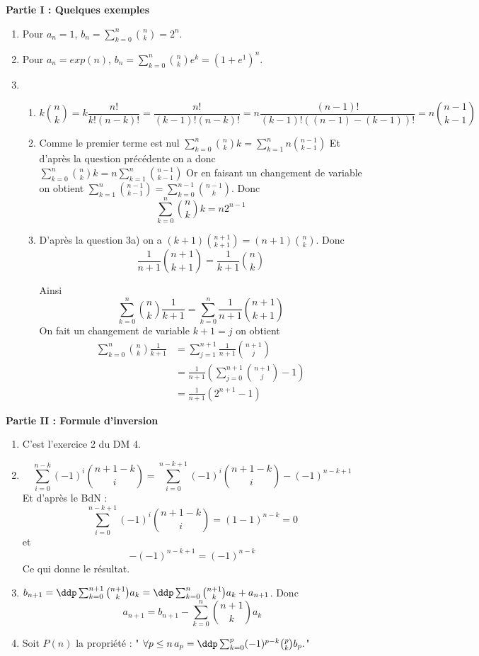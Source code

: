 \documentclass[a4paper, 11pt,reqno]{article}
\begin{document}
\begin{correction}
\begin{center}
\textbf{Partie I : Quelques exemples}
\end{center}
\begin{enumerate}
\item Pour $a_n=1$, $b_n=\sum_{k=0}^n \binom{n}{k}  =2^n$.
\item  Pour $a_n=exp(n)$, $b_n=\sum_{k=0}^n \binom{n}{k}e^k  =(1+e^1)^n$.
\item
\begin{enumerate}
\item  $$k\binom{n}{k}= k \frac{n! }{k! (n-k)!} = \frac{n! }{(k-1)! (n-k)!}  = n \frac{(n-1)! }{(k-1)! ((n-1)-(k-1))!}=  n\binom{n-1}{k-1}$$
\item
Comme le premier terme est nul  $\sum_{k=0}^n \binom{n}{k} k = \sum_{k=1}^n n\binom{n-1}{k-1}$
Et d'après la question précédente on a donc $ \sum_{k=0}^n \binom{n}{k} k= n  \sum_{k=1}^n \binom{n-1}{k-1}$
Or en faisant un changement de variable on obtient $\sum_{k=1}^n \binom{n-1}{k-1}= \sum_{k=0}^{n-1} \binom{n-1}{k}$. 
Donc $$ \sum_{k=0}^n \binom{n}{k} k = n 2^{n-1}$$

\item 
D'après la question 3a) on a $ (k+1)\binom{n+1}{k+1} = (n+1)\binom{n}{k}$. Donc 
$$\frac{1}{n+1}\binom{n+1}{k+1} =\frac{1}{k+1}\binom{n}{k}$$

Ainsi $$\sum_{k=0}^n \binom{n}{k} \frac{1}{k+1} = \sum_{k=0}^{n} \frac{1}{n+1}\binom{n+1}{k+1}$$
On fait un changement de variable $k+1=j$ on obtient 
\begin{align*}
\sum_{k=0}^n \binom{n}{k} \frac{1}{k+1} &=  \sum_{j=1}^{n+1} \frac{1}{n+1}\binom{n+1}{j}\\
															&=  \frac{1}{n+1} \left( \sum_{j=0}^{n+1} \binom{n+1}{j} -1\right)\\
															&= \frac{1}{n+1} \left( 2^{n+1}-1\right)
\end{align*}
\end{enumerate}
\end{enumerate}



\begin{center}
\textbf{Partie II : Formule d'inversion }
\end{center}
\begin{enumerate}
\item C'est l'exercice 2 du DM 4.
\item 
$$\sum_{i=0}^{n-k} (-1)^i  \binom{n+1-k}{i}= \sum_{i=0}^{n-k+1} (-1)^i  \binom{n+1-k}{i} -(-1)^{n-k+1} $$ 
Et d'après le BdN : 
$$ \sum_{i=0}^{n-k+1} (-1)^i  \binom{n+1-k}{i} =(1-1)^{n-k} =0$$ 
et 
$$-(-1)^{n-k+1} =(-1)^{n-k}$$
Ce qui donne le résultat. 
\item $b_{n+1} = \ddp \sum_{k=0}^{n+1} \binom{n+1}{k} a_k =\ddp  \sum_{k=0}^{n} \binom{n+1}{k} a_k   +a_{n+1}$. Donc
$$a_{n+1} = b_{n+1}-\sum_{k=0}^{n} \binom{n+1}{k} a_k$$
\item Soit $P(n)$ la propriété : " $\forall p \leq n \, a_p =\ddp \sum_{k=0}^p (-1)^{p-k} \binom{p}{k} b_p.$"\\


\end{enumerate}
\end{correction}
\end{document}
